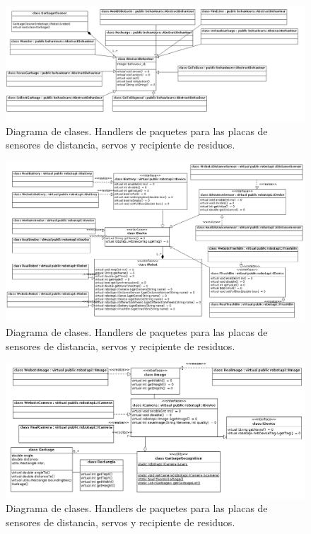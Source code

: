 \begin{landscape}
\begin{figure}[h]
	\centering
	\includegraphics[scale=0.52]{comportamientos/figures/api1.png}
	\caption[Diagrama de clases: Handlers 2]{Diagrama de clases. Handlers de paquetes para las placas de sensores de 
	distancia, servos y recipiente de residuos.}
	\label{fig:diagclases}
\end{figure}
\end{landscape}
\begin{landscape}
\begin{figure}[h]
	\centering
	\includegraphics[scale=0.5]{comportamientos/figures/api2.png}
	\caption[Diagrama de clases: Handlers 2]{Diagrama de clases. Handlers de paquetes para las placas de sensores de 
	distancia, servos y recipiente de residuos.}
	\label{fig:diagclases}
\end{figure}
\end{landscape}
\begin{landscape}
\begin{figure}[h]
	\centering
	\includegraphics[scale=0.5]{comportamientos/figures/api3.png}
	\caption[Diagrama de clases: Handlers 2]{Diagrama de clases. Handlers de paquetes para las placas de sensores de 
	distancia, servos y recipiente de residuos.}
	\label{fig:diagclases}
\end{figure}
\end{landscape}



